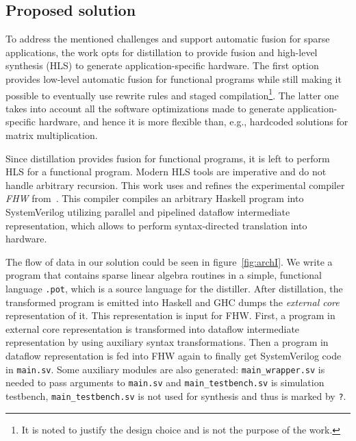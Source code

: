 \subsection{Proposed solution}\label{sec:requirements}

To address the mentioned challenges and support automatic fusion for sparse applications, the work opts for distillation to provide fusion and high-level synthesis (HLS) to generate application-specific hardware. The first option provides low-level automatic fusion for functional programs while still making it possible to eventually use rewrite rules and staged compilation\footnote{It is noted to justify the design choice and is not the purpose of the work.}. The latter one takes into account all the software optimizations made to generate application-specific hardware, and hence it is more flexible than, e.g., hardcoded solutions for matrix multiplication.

Since distillation provides fusion for functional programs, it is left to perform HLS for a functional program. 
Modern HLS tools are imperative and do not handle arbitrary recursion. This work uses and refines the experimental compiler \emph{FHW} from~\cite{funcHLS}. 
This compiler compiles an arbitrary Haskell program into SystemVerilog utilizing parallel and pipelined dataflow intermediate representation, which allows to perform syntax-directed translation into hardware.


The flow of data in our solution could be seen in figure~\ref{fig:archI}. We write a program that contains sparse linear algebra routines in a simple, functional language \texttt{.pot}, which is a source language for the distiller. After distillation, the transformed program is emitted into Haskell and GHC dumps the \textit{external core} representation of it. This representation is input for FHW. First, a program in external core representation is transformed into dataflow intermediate representation by using auxiliary syntax transformations. Then a program in dataflow representation is fed into FHW again to finally get SystemVerilog code in \texttt{main.sv}. Some auxiliary modules are also generated: \texttt{main\_wrapper.sv} is needed to pass arguments to \texttt{main.sv} and \texttt{main\_testbench.sv} is simulation testbench, \texttt{main\_testbench.sv} is not used for synthesis and thus is marked by \texttt{?}.

